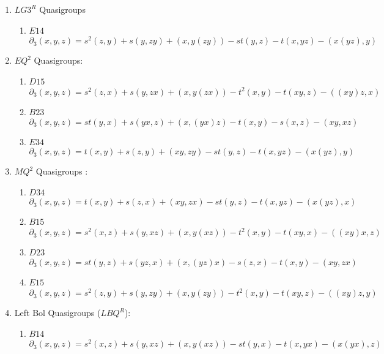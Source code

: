 \documentclass[11pt]{amsart}
\theoremstyle{definition}
\begin{document}
\begin{enumerate}
\item[(7)] $LG3^R$ Quasigroups

    \begin{enumerate}
        \item $E14$
 \[ \partial_3(x,y,z)= s^2(z, y) + s(y, z y)+ (x, y (z y)) - st (y, z)  -
  t(x, y z)     - (x (y z), y)   \]
    \end{enumerate}

\item[(8)] $EQ^2$ Quasigroups:
            
    \begin{enumerate}
        \item $D15$
        \[ \partial_3(x,y,z)=  s^2 (z, x)+ s(y, z x) + (x, y (z x)) - t^2 (x, y)    -
  t(x y, z)  -((x y) z, x)   \]
        \item $B23$
        \[ \partial_3(x,y,z)=st (y, x)+ s (y x, z) + (x, (y x) z) - 
 t (x, y)  - s(x, z)   -(x y, x z)     \]
        \item $E34$
        \[ \partial_3(x,y,z)= t(x, y) + s (z, y)  + (x y, z y) - st (y, z) - 
 t (x, y z)    - (x (y z), y)   \]
    \end{enumerate}

\item[(9)]  $MQ^2$ Quasigroups :

    \begin{enumerate}
        \item $D34$
        \[ \partial_3(x,y,z)=  t(x, y) + s (z, x) + (x y, z x) - st (y, z) - 
 t (x, y z)   - (x (y z), x)     \]
        \item $B15$
        \[ \partial_3(x,y,z)= s^2 (x, z) + s(y, x z) + (x, y (x z))   - t^2 (x, y)  -
  t (x y, x)  - ((x y) x, z)   \]
        \item $D23$
        \[ \partial_3(x,y,z)=st (y, z) + s(y z, x)  + (x, (y z) x) - s (z, x)   -  t(x, y)  -(x y, z x) \]
        \item $E15$
        \[ \partial_3(x,y,z)= s^2 (z, y) + s (y, z y) + (x, y (z y)) - t^2 (x, y)   -
  t (x y, z)   -((x y) z, y)     \]
    \end{enumerate}

\item[(10)] Left Bol Quasigroups ($LBQ^R$):
    
    \begin{enumerate}
        \item $B14$
        \[ \partial_3(x,y,z)= s^2 (x, z) + s (y, x z) + (x, y (x z)) - st (y, x)  - t (x, y x)   - (x (y x), z)     \]
    \end{enumerate}


\end{enumerate}
\end{document}
